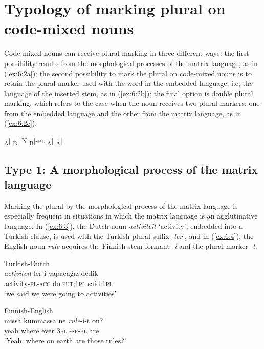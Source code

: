 \section{Typology of marking plural on code-mixed nouns}

Code-mixed nouns can receive plural marking in three different ways: the first possibility  results from the morphological processes of the matrix language, as in (\ref{ex:6:2a}); the second possibility to mark the plural on code-mixed nouns is to retain the plural marker used with the word in the embedded language, i.e, the language of the inserted stem, as in (\ref{ex:6:2b}); the final option is double plural marking, which refers to the case when the noun receives two plural markers: one from the embedded language and the other from the matrix language, as in (\ref{ex:6:2c}).

\ea 
\ea
	\textsubscript{A}[ \textsubscript{B}[ N \textsubscript{B}]-\textsc{pl} \textsubscript{A}]\label{ex:6:2a}
\label{ex:6:2b}
\ex	{\textsubscript{A}[ \textsubscript{B}[ N-\textsc{pl} \textsubscript{B}]-\textsc{pl}}\textsubscript{A}]\label{ex:6:2c}
\z
\z

\subsection{Type 1: A morphological process of the matrix language}

Marking the plural by the morphological process of the matrix language is especially frequent in situations in which the matrix language is an agglutinative language. In (\ref{ex:6:3}), the Dutch noun \textit{activiteit} `activity', embedded into a Turkish clause, is used with the Turkish plural suffix -\textit{ler}-, and in (\ref{ex:6:4}), the English noun \textit{rule} acquires the Finnish stem formant -\textit{i} and the plural marker -\textit{t}. 

\ea
\label{ex:6:3}
Turkish-Dutch \citep[150]{backus-two-1996}\\
\gll \textit{activiteit}-ler-i {yapacağız} {dedik}\\
	activity-\textsc{pl-acc} do:\textsc{fut;1pl} said:\textsc{1pl}\\
\glt `we said we were going to activities'
\z

\ea
\label{ex:6:4}
Finnish-English \citep[60]{halmari-government-1997}\\
 {missä} {kummassa} {ne} \textit{rule}-i-t {on}?\\
	yeah where ever \textsc{3pl} {\phantom{mm}}-\textsc{sf-pl} are\\
\glt `Yeah, where on earth are those rules?'
\z


